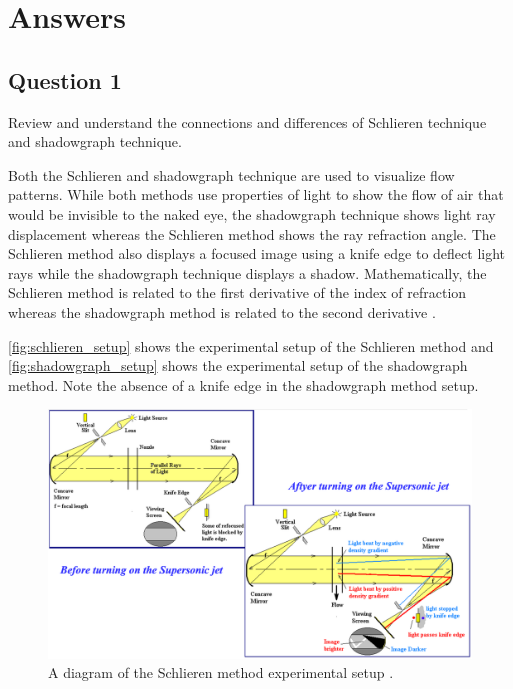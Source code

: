 \chapter{Answers}
\label{cp:answers}

\section{Question 1}

\begin{importantbox}
    Review and understand the connections and differences of Schlieren technique and shadowgraph technique.
\end{importantbox}

Both the Schlieren and shadowgraph technique are used to visualize flow patterns. While both methods use properties of light to show the flow of air that would be invisible to the naked eye, the shadowgraph technique shows light ray displacement whereas the Schlieren method shows the ray refraction angle. The Schlieren method also displays a focused image using a knife edge to deflect light rays while the shadowgraph technique displays a shadow. Mathematically, the Schlieren method is related to the first derivative of the index of refraction whereas the shadowgraph method is related to the second derivative \citep{lecture9}.

\autoref{fig:schlieren_setup} shows the experimental setup of the Schlieren method and \autoref{fig:shadowgraph_setup} shows the experimental setup of the shadowgraph method. Note the absence of a knife edge in the shadowgraph method setup.

\begin{figure}[htpb]
    \centering
    \includegraphics[width=\linewidth]{Figures/schlieren.png}
    \caption[Diagram of the Schlieren method.]{A diagram of the Schlieren method experimental setup \citep{lecture9}.}
    \label{fig:schlieren_setup}
\end{figure}

